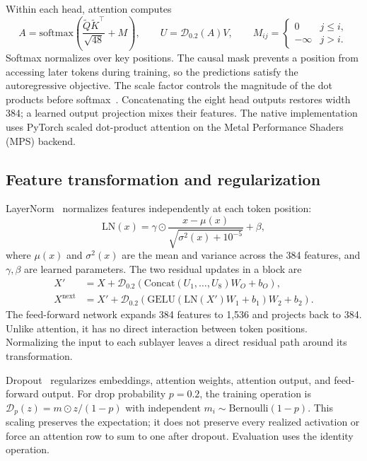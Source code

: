 \documentclass{article}
\begin{document}
Within each head, attention computes
\begin{equation}
A=\mathrm{softmax}\!\left(\frac{\widetilde Q\widetilde K^\top}{\sqrt{48}}+M\right),
\qquad U=\mathcal{D}_{0.2}(A)V,\qquad
M_{ij}=\begin{cases}0&j\leq i,\\-\infty&j>i.\end{cases}
\label{eq:attention}
\end{equation}
Softmax normalizes over key positions. The causal mask prevents a position from accessing later tokens during training, so the predictions satisfy the autoregressive objective. The scale factor controls the magnitude of the dot products before softmax~\cite{attention}. Concatenating the eight head outputs restores width 384; a learned output projection mixes their features. The native implementation uses PyTorch scaled dot-product attention on the Metal Performance Shaders (MPS) backend.

\subsection{Feature transformation and regularization}
LayerNorm~\cite{layernorm} normalizes features independently at each token position:
\begin{equation}
\mathrm{LN}(x)=\gamma\odot\frac{x-\mu(x)}
{\sqrt{\sigma^2(x)+10^{-5}}}+\beta,
\label{eq:ln}
\end{equation}
where $\mu(x)$ and $\sigma^2(x)$ are the mean and variance across the 384 features, and $\gamma,\beta$ are learned parameters. The two residual updates in a block are
\begin{align}
X'&=X+\mathcal{D}_{0.2}\!\left(\mathrm{Concat}(U_1,\ldots,U_8)W_O+b_O\right),\\
X^{\mathrm{next}}&=X'+\mathcal{D}_{0.2}\!\left(
\mathrm{GELU}(\mathrm{LN}(X')W_1+b_1)W_2+b_2\right).
\label{eq:block}
\end{align}
The feed-forward network expands 384 features to 1,536 and projects back to 384. Unlike attention, it has no direct interaction between token positions. Normalizing the input to each sublayer leaves a direct residual path around its transformation.

Dropout~\cite{dropout} regularizes embeddings, attention weights, attention output, and feed-forward output. For drop probability $p=0.2$, the training operation is $\mathcal{D}_p(z)=m\odot z/(1-p)$ with independent $m_i\sim\mathrm{Bernoulli}(1-p)$. This scaling preserves the expectation; it does not preserve every realized activation or force an attention row to sum to one after dropout. Evaluation uses the identity operation.
\end{document}
